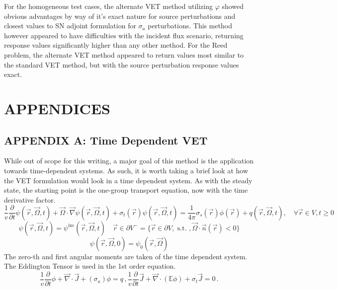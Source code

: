 \documentclass[12pt]{report}
\newcommand{\vr}{\vec{r}}
\newcommand{\vO}{\vec{\Omega}}
\renewcommand{\div}{\vec{\nabla} \cdot}
\newcommand{\grad}{\vec{\nabla}}
\newcommand{\Edd}{\mathbb{E}}
\newcommand{\sigt}{\sigma_t}
\newcommand{\sigs}{\sigma_s}
\newcommand{\siga}{\sigma_a}
\newcommand{\scalSource}{q}
\begin{document}
For the homogeneous test cases, the alternate VET method utilizing $\varphi$ showed obvious advantages by way of it's exact nature for source perturbations and closest values to SN adjoint formulation for $\sigma_a$ perturbations. This method however appeared to have difficulties with the incident flux scenario, returning response values significantly higher than any other method. For the Reed problem, the alternate VET method appeared to return values most similar to the standard VET method, but with the source perturbation response values exact. 

\newpage
\chapter{\uppercase{Appendices}}

\section{APPENDIX A: Time Dependent VET}
While out of scope for this writing, a major goal of this method is the application towards time-dependent systems. As such, it is worth taking a brief look at how the VET formulation would look in a time dependent system. As with the steady state, the starting point is the one-group transport equation, now with the time derivative factor.
\begin{equation}
\label{Trans1GTE}
\frac{1}{v} \frac{\partial}{\partial t} \psi(\vr,\vO,t)+ \vO \cdot \grad \psi(\vr,\vO,t) + \sigt(\vr) \psi(\vr,\vO,t) = \frac{1}{4 \pi} \sigs(\vr) \phi(\vr) + q(\vr,\vO,t), \quad \forall \vr \in V,t \geq 0
\end{equation}
\begin{equation}
\label{Trans1GTE_bc}
\psi(\vr,\vO,t) = \psi^{\text{inc}}(\vr,\vO,t) \quad \vr \in \partial V^{-} = \{ \vr \in \partial V, \text{ s.t. }, \vO \cdot \vec{n}(\vr) < 0\}
\end{equation}
\begin{equation}
\label{Trans1GTE_t0}
\psi(\vr,\vO,0) = \psi_0(\vr,\vO)
\end{equation}
The zero-th and first angular moments are taken of the time dependent system. The Eddington Tensor is used in the 1st order equation.
\begin{subequations}
%
\begin{equation}
\label{0amTrans}
\frac{1}{v} \frac{\partial}{\partial t}\phi + \div \vec{J} + (\siga) \phi = \scalSource \,,
\end{equation}
%
\begin{equation}
\label{1amTrans}
\frac{1}{v} \frac{\partial}{\partial t}\vec{J}  + \div \left( \Edd \phi \right) + \sigt \vec{J} = 0 \,.
\end{equation}
%
\end{subequations}
\end{document}
